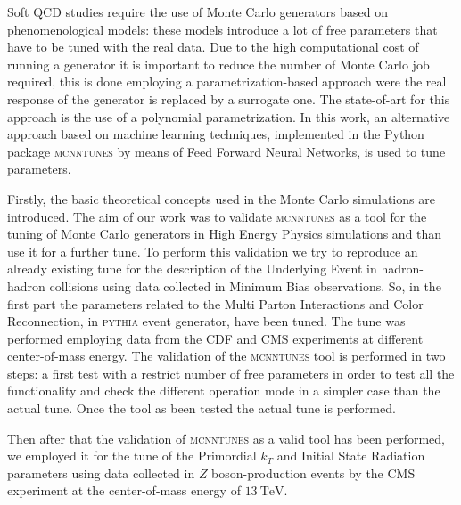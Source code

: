 Soft QCD studies require the use of Monte Carlo generators based on phenomenological models: these models introduce a lot of free parameters that have to be tuned with the real data.
Due to the high computational cost of running a generator it is important to reduce the number of Monte Carlo job required, this is done employing a parametrization-based approach were the real response of the generator is replaced by a surrogate one. The state-of-art for this approach is the use of a polynomial parametrization. 
In this work, an alternative approach based on machine learning techniques, implemented in the Python package \textsc{mcnntunes} by means of Feed Forward Neural Networks, is used to tune parameters. 

\medskip

Firstly, the basic theoretical concepts used in the Monte Carlo simulations are introduced.
The aim of our work was to validate \textsc{mcnntunes} as a tool for the tuning of Monte Carlo generators in High Energy Physics simulations and than use it for a further tune.
To perform this validation we try to reproduce an already existing tune for the description of the Underlying Event in hadron-hadron collisions using data collected in Minimum Bias observations.
So, in the first part the parameters related to the Multi Parton Interactions and Color Reconnection, in \textsc{pythia} event generator, have been tuned. The tune was performed employing data from the CDF and CMS experiments at different center-of-mass energy. The validation of the \textsc{mcnntunes} tool is performed in two steps: a first test with a restrict number of free parameters in order to test all the functionality and check the different operation mode in a simpler case than the actual tune. Once the tool as been tested   the actual tune is performed. 

\medskip

Then after that the validation of \textsc{mcnntunes} as a valid  tool has been performed, we employed it for the tune of the Primordial $k_T$ and Initial State Radiation parameters using data collected in $Z$ boson-production events by the CMS experiment at the center-of-mass energy of $13\ \mathrm{TeV}$. 


%

